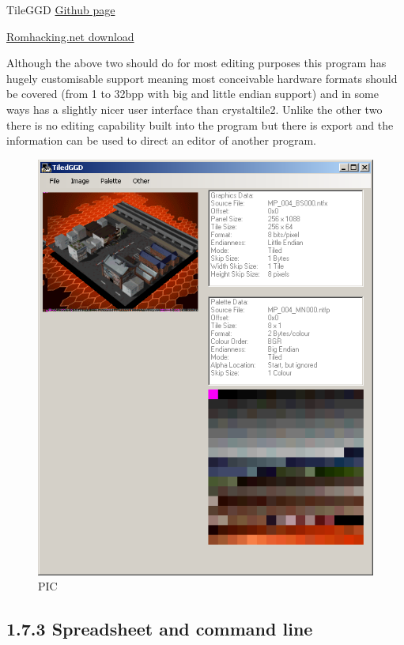 \documentclass[
]{book}
\begin{document}
TileGGD \href{https://github.com/barubary/tiledggd}{Github page}

\href{http://www.romhacking.net/utilities/646/}{Romhacking.net download}

Although the above two should do for most editing purposes this program has hugely customisable support meaning most conceivable hardware formats should be covered (from 1 to 32bpp with big and little endian support) and in some ways has a slightly nicer user interface than crystaltile2. Unlike the other two there is no editing capability built into the program but there is export and the information can be used to direct an editor of another program.

\begin{figure}
\centering
\includegraphics{images/15_home_fast6191_romhackingguide_unrenamed_file___romhackingguidetileeeditorsshowcasetileggd1.png}
\caption{PIC}
\end{figure}

\hypertarget{spreadsheet-and-command-line}{%
\subsection{1.7.3 Spreadsheet and command line}\label{spreadsheet-and-command-line}}
\end{document}
